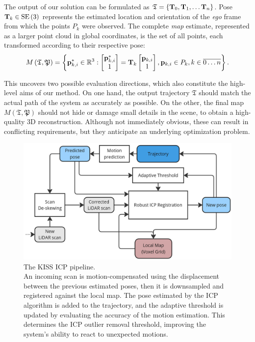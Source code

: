 The output of our solution can be formulated as $\mathfrak{T} = \left\{ \mathbf{T}_0, \mathbf{T}_1, \dots \mathbf{T}_n\right\}$. Pose $\mathbf{T}_k \in \operatorname{SE}\left(3\right)$ represents the estimated location and orientation of the \emph{ego} frame from which the points $P_k$ were observed. The complete \emph{map} estimate, represented as a larger point cloud in global coordinates, is the set of all points, each transformed according to their respective pose:
\begin{equation}
	M\left(\mathfrak{T}, \mathfrak{P}\right) =
	\left\{
	\mathbf{p}_{k,i}^* \in {\mathbb{R}}^3:
	\begin{bmatrix}
		\mathbf{p}_{k,i}^* \\ 1
	\end{bmatrix} =
	\mathbf{T}_k \begin{bmatrix}
		\mathbf{p}_{k,i} \\ 1
	\end{bmatrix}, \mathbf{p}_{k,i} \in P_k, k \in \overline{0 \dots n}
	\right\}\text{.}
\end{equation}

This uncovers two possible evaluation directions, which also constitute the high-level aims of our method. On one hand, the output trajectory  $\mathfrak{T}$ should match the actual path of the system as accurately as possible. On the other, the final map $M\left(\mathfrak{T}, \mathfrak{P}\right)$ should not hide or damage small details in the scene, to obtain a high-quality 3D reconstruction. Although not immediately obvious, these can result in conflicting requirements, but they anticipate an underlying optimization problem.

\begin{figure}[h]
	\centering
	\includegraphics[width=0.6\linewidth]{images/kiss-icp-architecture.jpg}
	\caption[KISS ICP Architecture]{The KISS ICP pipeline.\\An incoming scan is motion-compensated using the displacement between the previous estimated poses, then it is downsampled and registered against the local map. The pose estimated by the ICP algorithm is added to the trajectory, and the adaptive threshold is updated by evaluating the accuracy of the motion estimation. This determines the ICP outlier removal threshold, improving the system's ability to react to unexpected motions.}
	\label{fig:kiss-icp-architecture}
\end{figure}

